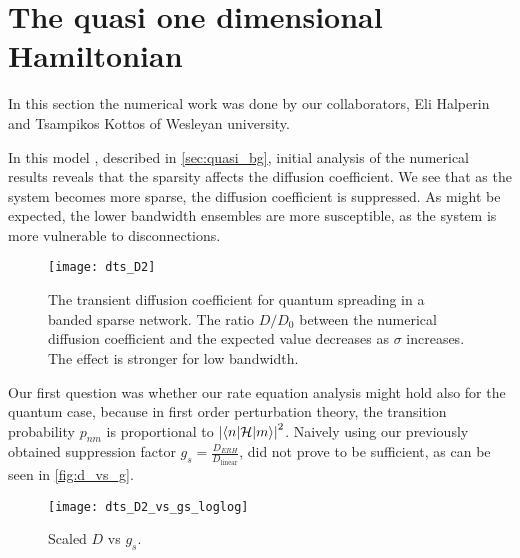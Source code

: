 








\section{The quasi one dimensional Hamiltonian}

In this section the numerical work was done by our collaborators,
Eli Halperin and Tsampikos Kottos of Wesleyan university.

In this model , described in \autoref{sec:quasi_bg}, initial analysis of
the numerical results reveals that the sparsity affects the diffusion coefficient.
We see that as the system becomes more sparse, the diffusion coefficient is suppressed. 
As might be expected, the lower bandwidth ensembles are more
susceptible, as the system is more vulnerable to disconnections.


\begin{figure}
\texttt{[image: dts\_D2]}
\caption{The transient diffusion coefficient for quantum spreading in
a banded sparse network. The ratio $D/D_0$ between the numerical diffusion 
coefficient and the expected value decreases as $\sigma$ increases. The effect
is stronger for low bandwidth.}
\end{figure}


Our first question was whether our rate equation analysis might
hold also for the quantum case, because in first order perturbation theory,
the transition probability $p_{nm}$ is proportional to $\left|\left\langle n|\mathcal{H} | m \right\rangle\right|^2$.
Naively using our previously obtained suppression factor $g_s = \frac{D_{ERH}}{D_{\textrm{linear}}}$,
did not prove to be sufficient, as can be seen in \autoref{fig:d_vs_g}.

\begin{figure}
\texttt{[image: dts\_D2\_vs\_gs\_loglog]}
\caption{Scaled $D$ vs $g_s$. }\label{fig:d_vs_g}
\end{figure}
